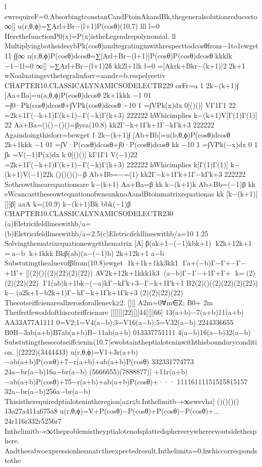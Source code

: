 {{{{{{{{{{{{{{{l
ewrequireF=0.AbsorbingtconstanCandFtoinAkandBk,thegeneralsolutionreducesto
∞[]
u(r,θ,ϕ)=∑Arl+Br−(l+1)P(cosθ)(10.7)
lll
l=0
HerethefunctionP0(x)=P(x)istheLegendrepolynomial.
ll
MultiplyingbothsidesybPk(cosθ)andtegratinginwithrespecttodcosθfrom−1to1ewget
11
∫∫∞
u(r,θ,ϕ)P(cosθ)dcosθ=∑[Arl+Br−(l+1)]P(cosθ)P(cosθ)dcosθ
kkklk
−1−1l=0
∞[]
=∑Arl+Br−(l+1)2δ
kk2l+1lk
l=0
=[Akrk+Bkr−(k+1)]2
2k+1
wNoaluatingevthetegralinforr=aandr=b.respelyectiv
CHAPTER10.CLASSICALYNAMICSODELECTR229
orFr=a
1
2k−(k+1)∫
[Aa+Ba]=u(a,θ,ϕ)P(cosθ)dcosθ
2k+1kkk
−1
01
=∫0·Pk(cosθ)dcosθ+∫VPk(cosθ)dcosθ
−10
1
=∫VPk(x)dx
0[()()]
VΓ1Γ1
22
=2k+1Γ(−k+1)Γ(k+1)−Γ(−k)Γ(k+3)
222222
hWhicimplies
k−(k+1)V[Γ(1)Γ(1)]
22
Aa+Ba=()()−()()=βysa(10.8)
kk2Γ−k+1Γk+1Γ−kΓk+3
222222
Againdoingthisforr=bewget
1
2k−(k+1)∫
[Ab+Bb]=u(b,θ,ϕ)P(cosθ)dcosθ
2k+1kkk
−1
01
=∫V·P(cosθ)dcosθ+∫0·P(cosθ)dcosθ
kk
−10
1
=∫VPk(−x)dx
0
1
∫k
=V(−1)P(x)dx
k
0[()()]
kΓ1Γ1
V(−1)22
=2k+1Γ(−k+1)Γ(k+1)−Γ(−k)Γ(k+3)
222222
hWhicimplies
k[Γ(1)Γ(1)]
k−(k+1)V(−1)22k
()()()()−β
Ab+Bb=−=(1)
kk2Γ−k+1Γk+1Γ−kΓk+3
222222
Sotheowtlinearequationsare
k−(k+1)
Aa+Ba=β
kk
k−(k+1)k
Ab+Bb=(−1)β
kk
eWcancasttheseowtequationofwnsunknoAandBtoinmatrixequationas
kk
[k−(k+1)][][β]
aaA
k=(10.9)
k−(k+1)Bk
bbk(−1)β
CHAPTER10.CLASSICALYNAMICSODELECTR230
(a)Eletricifeldlineswithb/a=(b)Eletricifeldlineswithb/a=2.5(c)Eletricifeldlineswithb/a=10
1.25
Solvingthematrixequationewgetthematrix
[A]β(ak+1−(−1)kbk+1)
k2k+12k+1
=a−b
k+1kkk
Bkβ(ab)(a−(−1)b)
2k+12k+1
a−b
Substutingthealuevofβfrom(10.8)ewget
1k+1k+1kk3kk1
Γa+(−b)Γ−Γ+−Γ−+1Γ+
[](2)()((2)(22)(2)(22))
AV2k+12k+1kkk1k3
(a−b)Γ−Γ−+1Γ+Γ+
k=(2)(2)(22)(22)
Γ1(ab)k+1bk−(−a)kΓ−kΓk+3−Γ−k+1Γk+1
B2(2)()((2)(22)(2)(22))
k−
(a2k+1−b2k+1)Γ−kΓ−k+1Γk+1Γk+3
(2)(2)(22)(22)
Thecotseiffcienareallzerosforallenevk≥2.
[][]
A2m=0∀m∈Z;
B0+
2m
Theifrstfewoddofthiscoteiffcienare
[][][][22][][44][][66]
13(a+b)−7(a+b)11(a+b)
AA33A77A1111
0=V2;1=V4(a−b);3=V16(a−b);5=V32(a−b)
2244336655
B0B−3ab(a+b)B7ab(a+b)B−11ab(a+b)
013337751111
4(a−b)16(a−b)32(a−b)
Substutingthesecotseiffcienin(10.7)ewobtaintheptialoteninwiththisboundarycondition.
[(2222)(3444433)
u(r,θ,ϕ)=V1+3r(a+b)−ab(a+b)P(cosθ)+7−r(a+b)+ab(a+b)P(cosθ)
332331774773
24a−br(a−b)16a−br(a−b)
(5666655)(7888877)]
+11r(a+b)−ab(a+b)P(cosθ)+75−r(a+b)+ab(a+b)P(cosθ)+···
11116111151515815157
32a−br(a−b)256a−br(a−b)
Thisistherequiredptialotenintheregion[a≤r≤b.Inthelimitb→∞ewevha]
()()()()
13a27a411a675a8
u(r,θ,ϕ)=V+P(cosθ)−P(cosθ)+P(cosθ)−P(cosθ)+...
24r116r332r5256r7
Inthelimitb→∞theproblemistheyptialotenofsplattedsphereerywhereevoutsidethesphere.
Andtheeabvoexpressionhesmatctheexpectedresult.Inthelimita=0,hwhiccorrespondstothe
}}}}}}}}}}}}}}}
